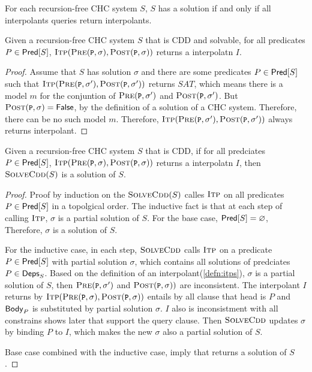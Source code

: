 For each recursion-free CHC system $S$, $S$ has a solution if and
only if all interpolants queries return interpolants.
%
\begin{lem}
  \label{lem:vc}
  Given a recursion-free CHC system $S$ that is CDD and solvable, for all predicates $P \in \mathsf{Pred}[ S ]$,
   $\solveitp(\prectr(\cc{P},\sigma),\postctr(\cc{P},\sigma))$ returns a interpolatn $I$.
\end{lem}
%
\begin{proof}
  Assume that $S$ has solution $\sigma$ and there are
  some predicates $P \in \mathsf{Pred}[ S ]$ such that $\solveitp(\prectr(\cc{P},\sigma'),\postctr(\cc{P},\sigma'))$
  returns $SAT$, which means there is a model $m$ for the conjuntion of $\prectr(\cc{P},\sigma')$
  and $\postctr(\cc{P},\sigma')$.
  But $\postctr(\cc{P},\sigma) = \false$, by the definition of
  a solution of a CHC system.
  Therefore, there can be no such model $m$.
  Therefore, $\solveitp(\prectr(\cc{P},\sigma'),\postctr(\cc{P},\sigma'))$ always returns interpolant.
\end{proof}

\begin{lem}
  \label{lem:solve-aux}
  Given a recursion-free CHC system $S$ that is CDD, if for all predciates $P \in \mathsf{Pred}[ S ]$, 
  $\solveitp(\prectr(\cc{P},\sigma),\postctr(\cc{P},\sigma))$ returns a interpolatn $I$, 
  then $\textsc{SolveCdd}(S)$ is a solution of $S$.
\end{lem}
%
\begin{proof}
  Proof by induction on the $\textsc{SolveCdd}(S)$ calles $\textsc{Itp}$ on all predicates $P \in \mathsf{Pred}[ S ]$
  in a topolgical order.
  The inductive fact is that at each step of calling $\textsc{Itp}$, $\sigma$ is a
  partial solution of $S$.
  For the base case, $\mathsf{Pred}[ S ] = \varnothing$,
  Therefore, $\sigma$ is a solution of $S$.

  For the inductive case, in each step, $\textsc{SolveCdd}$ calls $\textsc{Itp}$ on
  a predicate $P \in \mathsf{Pred}[ S ]$ with partial solution $\sigma$, which
  contains all solutions of predciates $P \in \mathsf{Deps}_{S}$.
  Based on the definition of an interpolant(\autoref{defn:itps}), $\sigma$
  is a partial solution of $S$, then $\prectr(\cc{P},\sigma')$ and $\postctr(\cc{P},\sigma))$
  are inconsistent.
  The interpolant $I$ returns by $\solveitp(\prectr(\cc{P},\sigma),\postctr(\cc{P},\sigma))$ entails
  by all clause that head is $P$ and $\mathsf{Body}_{P}$ is substituted by partial solution $\sigma$.
  $I$ also is inconsistment with all constrains shows later that support the query clause.
  Then $\textsc{SolveCdd}$ updates $\sigma$ by binding $P$ to $I$, which makes the new $\sigma$ also a partial
  solution of $S$.

  Base case combined with the inductive case, imply that \solvecdd
  returns a solution of $S$.
\end{proof}

